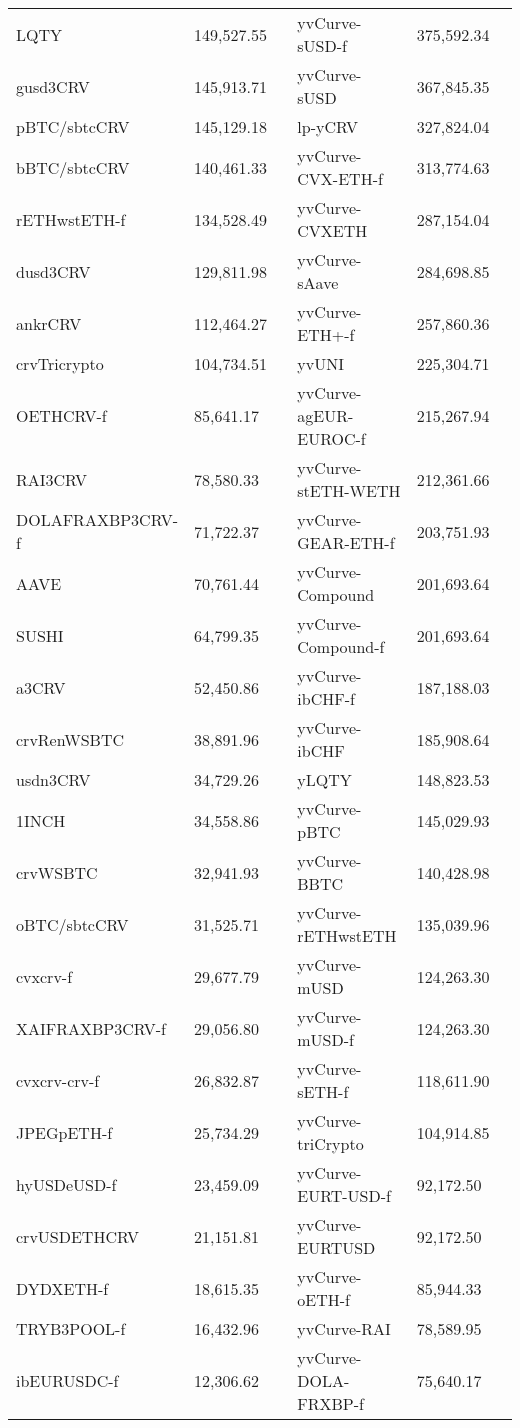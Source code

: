 \begin{longtable}{@{}p{0.25\linewidth}p{0.25\linewidth}p{0.25\linewidth}p{0.25\linewidth}@{}}
LQTY & 149,527.55 & yvCurve-sUSD-f & 375,592.34 \\
gusd3CRV & 145,913.71 & yvCurve-sUSD & 367,845.35 \\
pBTC/sbtcCRV & 145,129.18 & lp-yCRV & 327,824.04 \\
bBTC/sbtcCRV & 140,461.33 & yvCurve-CVX-ETH-f & 313,774.63 \\
rETHwstETH-f & 134,528.49 & yvCurve-CVXETH & 287,154.04 \\
dusd3CRV & 129,811.98 & yvCurve-sAave & 284,698.85 \\
ankrCRV & 112,464.27 & yvCurve-ETH+-f & 257,860.36 \\
crvTricrypto & 104,734.51 & yvUNI & 225,304.71 \\
OETHCRV-f & 85,641.17 & yvCurve-agEUR-EUROC-f & 215,267.94 \\
RAI3CRV & 78,580.33 & yvCurve-stETH-WETH & 212,361.66 \\
DOLAFRAXBP3CRV-f & 71,722.37 & yvCurve-GEAR-ETH-f & 203,751.93 \\
AAVE & 70,761.44 & yvCurve-Compound & 201,693.64 \\
SUSHI & 64,799.35 & yvCurve-Compound-f & 201,693.64 \\
a3CRV & 52,450.86 & yvCurve-ibCHF-f & 187,188.03 \\
crvRenWSBTC & 38,891.96 & yvCurve-ibCHF & 185,908.64 \\
usdn3CRV & 34,729.26 & yLQTY & 148,823.53 \\
1INCH & 34,558.86 & yvCurve-pBTC & 145,029.93 \\
crvWSBTC & 32,941.93 & yvCurve-BBTC & 140,428.98 \\
oBTC/sbtcCRV & 31,525.71 & yvCurve-rETHwstETH & 135,039.96 \\
cvxcrv-f & 29,677.79 & yvCurve-mUSD & 124,263.30 \\
XAIFRAXBP3CRV-f & 29,056.80 & yvCurve-mUSD-f & 124,263.30 \\
cvxcrv-crv-f & 26,832.87 & yvCurve-sETH-f & 118,611.90 \\
JPEGpETH-f & 25,734.29 & yvCurve-triCrypto & 104,914.85 \\
hyUSDeUSD-f & 23,459.09 & yvCurve-EURT-USD-f & 92,172.50 \\
crvUSDETHCRV & 21,151.81 & yvCurve-EURTUSD & 92,172.50 \\
DYDXETH-f & 18,615.35 & yvCurve-oETH-f & 85,944.33 \\
TRYB3POOL-f & 16,432.96 & yvCurve-RAI & 78,589.95 \\
ibEURUSDC-f & 12,306.62 & yvCurve-DOLA-FRXBP-f & 75,640.17 \\

\end{longtable}
